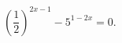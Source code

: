 \begin{ex}[type=equation]
	\begin{condition}
		$\left(\dfrac{1}{2}\right)^{2x - 1} - 5^{1 - 2x} = 0.$
	\end{condition}
\end{ex}